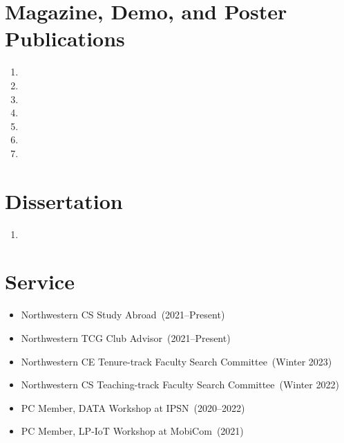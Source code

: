 \documentclass{article}
\begin{document}
\section*{Magazine, Demo, and Poster Publications}
\vspace{-6pt}
\begin{enumerate}
  \item {}
  \item {}
  \item {}
  \item {}
  \item {}
  \item {}
  \item {}
\end{enumerate}

\section*{Dissertation}
\vspace{-6pt}
\begin{enumerate}
  \item {}
\end{enumerate}



\section*{Service}
\vspace{-6pt}
\begin{itemize}
  \item[] Northwestern CS Study Abroad~(2021--Present)
  \item[] Northwestern TCG Club Advisor~(2021--Present)
  \item[] Northwestern CE Tenure-track Faculty Search Committee~(Winter 2023)
  \item[] Northwestern CS Teaching-track Faculty Search Committee~(Winter 2022)
  \item[] PC Member, DATA Workshop at IPSN~(2020--2022)
  \item[] PC Member, LP-IoT Workshop at MobiCom~(2021)
\end{itemize}
\end{document}
